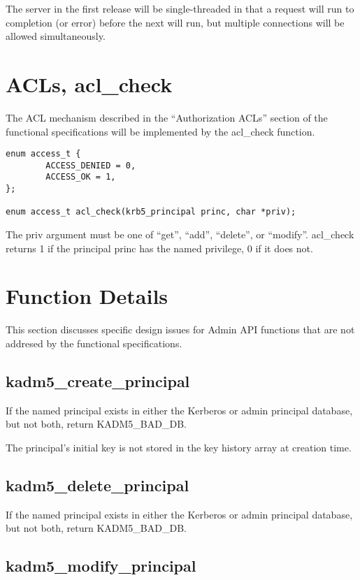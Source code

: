 The server in the first release will be single-threaded in that a
request will run to completion (or error) before the next will run,
but multiple connections will be allowed simultaneously.

\section{ACLs, acl_check}

The ACL mechanism described in the ``Authorization ACLs'' section of
the functional specifications will be implemented by the acl_check
function.

\begin{verbatim}
enum access_t {
        ACCESS_DENIED = 0,
        ACCESS_OK = 1,
};

enum access_t acl_check(krb5_principal princ, char *priv);
\end{verbatim}

The priv argument must be one of ``get'', ``add'', ``delete'', or
``modify''.  acl_check returns 1 if the principal princ has the named
privilege, 0 if it does not.

\section{Function Details}

This section discusses specific design issues for Admin API functions
that are not addresed by the functional specifications.

\subsection{kadm5_create_principal}

If the named principal exists in either the Kerberos or admin
principal database, but not both, return KADM5_BAD_DB.

The principal's initial key is not stored in the key history array at
creation time.

\subsection{kadm5_delete_principal}

If the named principal exists in either the Kerberos or admin
principal database, but not both, return KADM5_BAD_DB.

\subsection{kadm5_modify_principal}

